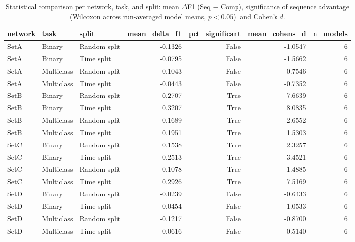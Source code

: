 \begin{table}
\caption{Statistical comparison per network, task, and split: mean $\Delta$F1 (Seq $-$ Comp), significance of sequence advantage (Wilcoxon across run-averaged model means, $p<0.05$), and Cohen's $d$.}
\label{tab:q1_stats}
\begin{tabular}{lllrrrr}
\toprule
network & task & split & mean_delta_f1 & pct_significant & mean_cohens_d & n_models \\
\midrule
SetA & Binary & Random split & -0.1326 & False & -1.0547 & 6 \\
SetA & Binary & Time split & -0.0795 & False & -1.5662 & 6 \\
SetA & Multiclass & Random split & -0.1043 & False & -0.7546 & 6 \\
SetA & Multiclass & Time split & -0.0443 & False & -0.7352 & 6 \\
SetB & Binary & Random split & 0.2707 & True & 7.6639 & 6 \\
SetB & Binary & Time split & 0.3207 & True & 8.0835 & 6 \\
SetB & Multiclass & Random split & 0.1689 & True & 2.6552 & 6 \\
SetB & Multiclass & Time split & 0.1951 & True & 1.5303 & 6 \\
SetC & Binary & Random split & 0.1538 & True & 2.3257 & 6 \\
SetC & Binary & Time split & 0.2513 & True & 3.4521 & 6 \\
SetC & Multiclass & Random split & 0.1078 & True & 1.4885 & 6 \\
SetC & Multiclass & Time split & 0.2926 & True & 7.5169 & 6 \\
SetD & Binary & Random split & -0.0239 & False & -0.6433 & 6 \\
SetD & Binary & Time split & -0.0454 & False & -1.0533 & 6 \\
SetD & Multiclass & Random split & -0.1217 & False & -0.8700 & 6 \\
SetD & Multiclass & Time split & -0.0616 & False & -0.5140 & 6 \\
\bottomrule
\end{tabular}
\end{table}
